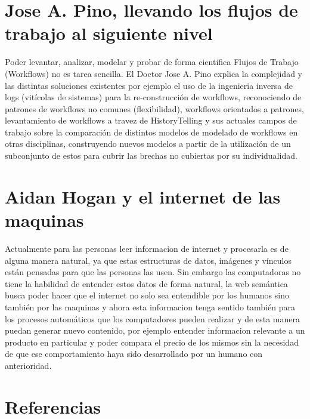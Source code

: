 \documentclass[12pt,letterpaper]{article}
\begin{document}
\section{Jose A. Pino, llevando los flujos de trabajo al siguiente nivel}

Poder levantar, analizar, modelar y probar de forma cientifica Flujos de Trabajo (Workflows) no es tarea sencilla. El Doctor Jose A. Pino explica la complejidad y las distintas soluciones existentes por ejemplo el uso de la ingenieria inversa de logs (vitícolas de sistemas) para la re-construcción de workflows, reconociendo de patrones de workflows no comunes (flexibilidad), workflows orientados a patrones, levantamiento de workflows a travez de HistoryTelling y sus actuales campos de trabajo sobre la comparación de distintos modelos de modelado de workflows en otras disciplinas, construyendo nuevos modelos a partir de la utilización de un subconjunto de estos para cubrir las brechas no cubiertas por su individualidad.

\section{Aidan Hogan y el internet de las maquinas}

Actualmente para las personas leer informacion de internet y procesarla es de alguna manera natural, ya que estas estructuras de datos, imágenes y vínculos están pensadas para que las personas las usen. Sin embargo las computadoras no tiene la habilidad de entender estos datos de forma natural, la web semántica busca poder hacer que el internet no solo sea entendible por los humanos sino también por las maquinas y ahora esta informacion tenga sentido también para los procesos automáticos que los computadores pueden realizar y de esta manera puedan generar nuevo contenido, por ejemplo entender informacion relevante a un producto en particular y poder compara el precio de los mismos sin la necesidad de que ese comportamiento haya sido desarrollado por un humano con anterioridad.

\section{Referencias\label{sec:references}}

\printbibliography[heading=none]
\end{document}
